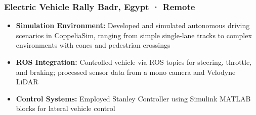 \subsubsection*{
	Electric Vehicle Rally
	\hspace*{\fill}
	\smallFormat Badr, Egypt · Remote
}
\begin{itemize}
	\item \textbf{Simulation Environment:} Developed and simulated autonomous driving scenarios in CoppeliaSim, ranging from simple single-lane tracks to complex environments with cones and pedestrian crossings
	\item \textbf{ROS Integration:} Controlled vehicle via ROS topics for steering, throttle, and braking; processed sensor data from a mono camera and Velodyne LiDAR
	\item \textbf{Control Systems:} Employed Stanley Controller using Simulink MATLAB blocks for lateral vehicle control
\end{itemize}
%
%
%
%
